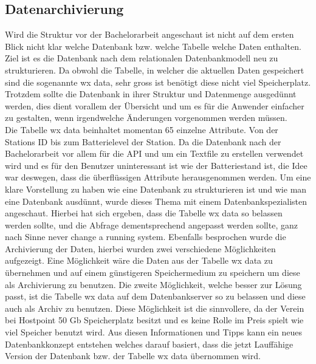 
\subsection{Datenarchivierung}

Wird die Struktur vor der Bachelorarbeit angeschaut ist nicht auf dem ersten Blick nicht klar welche Datenbank bzw. welche Tabelle welche Daten enthalten. Ziel ist es die Datenbank nach dem relationalen Datenbankmodell neu zu strukturieren. Da obwohl die Tabelle, in welcher die aktuellen Daten gespeichert sind die sogenannte wx data, sehr gross ist benötigt diese nicht viel Speicherplatz. Trotzdem sollte die Datenbank in ihrer Struktur und Datenmenge ausgedünnt werden, dies dient vorallem der Übersicht und um es für die Anwender einfacher zu gestalten, wenn irgendwelche Änderungen vorgenommen werden müssen.\\

Die Tabelle wx data beinhaltet momentan 65 einzelne Attribute. Von der Stations ID bis zum Batterielevel der Station. Da die Datenbank nach der Bachelorarbeit vor allem für die API und um ein Textfile zu erstellen verwendet wird und es für den Benutzer uninteressant ist wie der Batteriestand ist, die Idee war deswegen, dass die überflüssigen Attribute herausgenommen werden. Um eine klare Vorstellung zu haben wie eine Datenbank zu strukturieren ist und wie man eine Datenbank ausdünnt, wurde dieses Thema mit einem Datenbankspezialisten angeschaut. Hierbei hat sich ergeben, dass die Tabelle wx data so  belassen werden sollte, und die Abfrage dementsprechend angepasst werden sollte, ganz nach Sinne never change a running system. Ebenfalls besprochen wurde die Archivierung der Daten, hierbei wurden zwei verschiedene Möglichkeiten aufgezeigt. Eine Möglichkeit wäre die Daten aus der Tabelle wx data zu übernehmen und auf einem günstigeren Speichermedium zu speichern um diese als Archivierung zu benutzen. Die zweite Möglichkeit, welche besser zur Lösung passt, ist die Tabelle wx data auf dem Datenbankserver so zu belassen und diese auch als Archiv zu benutzen. Diese Möglichkeit ist die sinnvollere, da der Verein bei Hostpoint 50 Gb Speicherplatz besitzt und es keine Rolle im Preis spielt wie viel Speicher benutzt wird. Aus diesen Informationen und Tipps kann ein neues Datenbankkonzept entstehen welches darauf basiert, dass die jetzt Lauffähige Version der Datenbank bzw. der Tabelle wx data übernommen wird.

